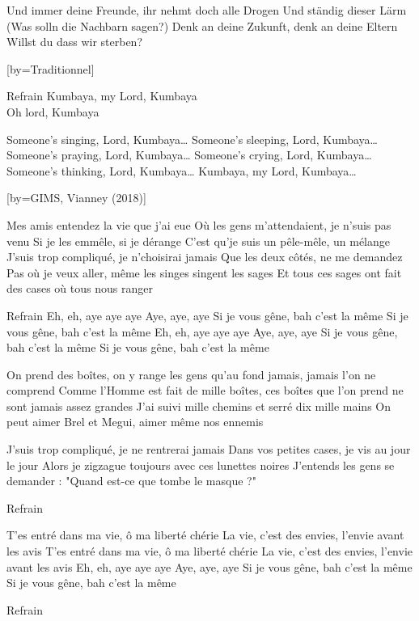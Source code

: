 \beginverse
Und immer deine Freunde, ihr nehmt doch alle Drogen
Und ständig dieser Lärm
(Was solln die Nachbarn sagen?)
Denk an deine Zukunft, denk an deine Eltern
Willst du dass wir sterben?
\endverse

[by={Traditionnel}]

\beginverse
Refrain
Kumbaya, my Lord, Kumbaya \\[3x]
Oh lord, Kumbaya
\endverse

\beginverse
Someone's singing, Lord, Kumbaya…
Someone's sleeping, Lord, Kumbaya…
Someone's praying, Lord, Kumbaya…
Someone's crying, Lord, Kumbaya…
Someone's thinking, Lord, Kumbaya…
Kumbaya, my Lord, Kumbaya…
\endverse

[by={GIMS, Vianney (2018)}]

\beginverse
Mes amis entendez la vie que j'ai eue
Où les gens m'attendaient, je n'suis pas venu
Si je les emmêle, si je dérange
C'est qu'je suis un pêle-mêle, un mélange
J'suis trop compliqué, je n'choisirai jamais
Que les deux côtés, ne me demandez
Pas où je veux aller, même les singes singent les sages
Et tous ces sages ont fait des cases où tous nous ranger
\endverse

\beginverse
Refrain
Eh, eh, aye aye aye
Aye, aye, aye
Si je vous gêne, bah c'est la même
Si je vous gêne, bah c'est la même
Eh, eh, aye aye aye
Aye, aye, aye
Si je vous gêne, bah c'est la même
Si je vous gêne, bah c'est la même
\endverse

\beginverse
On prend des boîtes, on y range les gens qu'au fond jamais, jamais l'on ne comprend
Comme l'Homme est fait de mille boîtes, ces boîtes que l'on prend ne sont jamais assez grandes
J'ai suivi mille chemins et serré dix mille mains
On peut aimer Brel et Megui, aimer même nos ennemis
\endverse

\beginverse
J'suis trop compliqué, je ne rentrerai jamais
Dans vos petites cases, je vis au jour le jour
Alors je zigzague toujours avec ces lunettes noires
J'entends les gens se demander : "Quand est-ce que tombe le masque ?"
\endverse

\beginverse
Refrain
\endverse

\beginverse
T'es entré dans ma vie, ô ma liberté chérie
La vie, c'est des envies, l'envie avant les avis
T'es entré dans ma vie, ô ma liberté chérie
La vie, c'est des envies, l'envie avant les avis
Eh, eh, aye aye aye
Aye, aye, aye
Si je vous gêne, bah c'est la même
Si je vous gêne, bah c'est la même
\endverse

\beginverse
Refrain
\endverse

